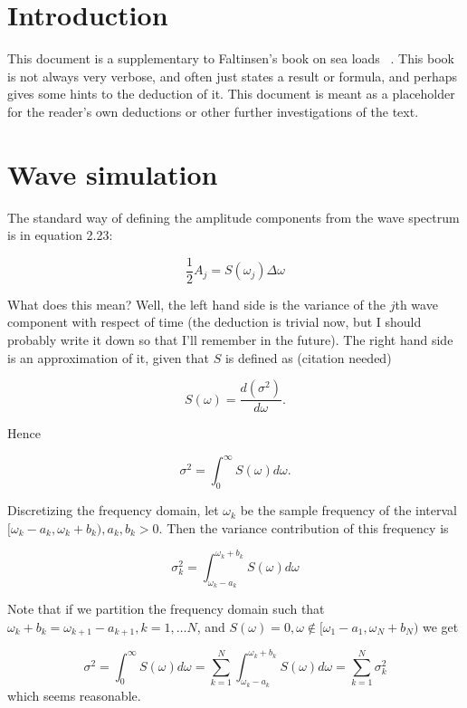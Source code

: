 \documentclass{article}
\begin{document}
\section{Introduction}
This document is a supplementary to Faltinsen's book on sea loads
~\cite{faltinsen90}. This book is not always very verbose, and often
just states a result or formula, and perhaps gives some hints to the
deduction of it. This document is meant as a placeholder for the
reader's own deductions or other further investigations of the text.

\section{Wave simulation}
The standard way of defining the amplitude components from the wave
spectrum is in equation 2.23:

\begin{equation}
  \frac{1}{2}A_j = S(\omega_j)\Delta\omega
\end{equation}

What does this mean? Well, the left hand side is the variance of the
$j$th wave component with respect of time (the deduction is trivial
now, but I should probably write it down so that I'll remember in the
future). The right hand side is an approximation of it, given that $S$
is defined as (citation needed)

\begin{equation}
  S(\omega) = \frac{d(\sigma^2)}{d\omega}.
\end{equation}

Hence

\begin{equation}
  \sigma^2 = \int_{0}^{\infty}S(\omega)d\omega.
\end{equation}

Discretizing the frequency domain, let $\omega_k$ be the sample
frequency of the interval $[\omega_k - a_k, \omega_k + b_k), a_k, b_k >
  0$. Then the variance contribution of this frequency is

\begin{equation}
  \sigma_k^2 = \int_{\omega_k - a_k}^{\omega_k + b_k}S(\omega)d\omega
\end{equation}

Note that if we partition the frequency domain such that $\omega_k +
b_k = \omega_{k+1} - a_{k+1}, k = 1, \ldots N$, and $S(\omega) = 0,
\omega \notin [\omega_1 - a_1, \omega_N + b_N )$ we get

\begin{equation}
  \sigma^2 = \int_{0}^{\infty}S(\omega)d\omega
  = \sum\limits_{k=1}^{N}\int_{\omega_k - a_k}^{\omega_k + b_k}S(\omega)d\omega
  = \sum\limits_{k=1}^{N}\sigma_k^2
\end{equation}
\noindent
which seems reasonable.
\end{document}
